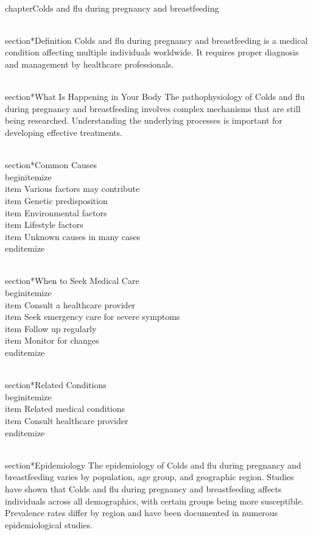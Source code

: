 
\\chapter{Colds and flu during pregnancy and breastfeeding}

\\section*{Definition}
Colds and flu during pregnancy and breastfeeding is a medical condition affecting multiple individuals worldwide. It requires proper diagnosis and management by healthcare professionals.

\\section*{What Is Happening in Your Body}
The pathophysiology of Colds and flu during pregnancy and breastfeeding involves complex mechanisms that are still being researched. Understanding the underlying processes is important for developing effective treatments.

\\section*{Common Causes}
\\begin{itemize}
\\item Various factors may contribute\n  \\item Genetic predisposition\n  \\item Environmental factors\n  \\item Lifestyle factors\n  \\item Unknown causes in many cases
\\end{itemize}

\\section*{When to Seek Medical Care}
\\begin{itemize}
\\item Consult a healthcare provider\n  \\item Seek emergency care for severe symptoms\n  \\item Follow up regularly\n  \\item Monitor for changes
\\end{itemize}

\\section*{Related Conditions}
\\begin{itemize}
\\item Related medical conditions\n  \\item Consult healthcare provider
\\end{itemize}

\\section*{Epidemiology}
The epidemiology of Colds and flu during pregnancy and breastfeeding varies by population, age group, and geographic region. Studies have shown that Colds and flu during pregnancy and breastfeeding affects individuals across all demographics, with certain groups being more susceptible. Prevalence rates differ by region and have been documented in numerous epidemiological studies.

